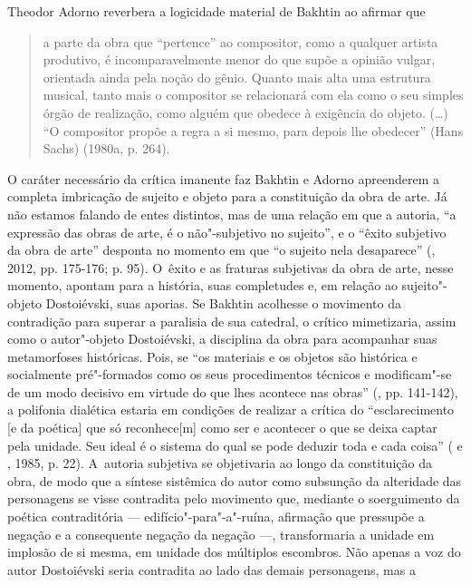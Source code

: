 Theodor Adorno reverbera a logicidade material de Bakhtin ao afirmar que

\begin{quote}
a parte da obra que ``pertence'' ao compositor, como a qualquer artista
produtivo, é incomparavelmente menor do que supõe a opinião vulgar,
orientada ainda pela noção do gênio. Quanto mais alta uma estrutura
musical, tanto mais o compositor se relacionará com ela como o seu
simples órgão de realização, como alguém que obedece à exigência do
objeto. (\ldots) ``O compositor propõe a regra a si mesmo, para depois lhe
obedecer'' (Hans Sachs) (1980a, p. 264).
\end{quote}

O caráter necessário da crítica imanente faz Bakhtin e Adorno
apreenderem a completa imbricação de sujeito e objeto para a
constituição da obra de arte. Já não estamos falando de entes distintos,
mas de uma relação em que a autoria, ``a expressão das obras de arte, é
o não"-subjetivo no sujeito'', e o ``êxito subjetivo da obra de arte''
desponta no momento em que ``o sujeito nela desaparece'' (, 2012,
pp. 175-176; p. 95). O~êxito e as fraturas subjetivas da obra de arte,
nesse momento, apontam para a história, suas completudes e, em relação
ao sujeito"-objeto Dostoiévski, suas aporias. Se Bakhtin acolhesse o
movimento da contradição para superar a paralisia de sua catedral, o
crítico mimetizaria, assim como o autor"-objeto Dostoiévski, a disciplina
da obra para acompanhar suas metamorfoses históricas. Pois, se ``os
materiais e os objetos são histórica e socialmente pré"-formados como os
seus procedimentos técnicos e modificam"-se de um modo decisivo em
virtude do que lhes acontece nas obras'' (, pp. 141-142), a
polifonia dialética estaria em condições de realizar a crítica do
``esclarecimento {[}e da poética{]} que só reconhece{[}m{]} como ser e
acontecer o que se deixa captar pela unidade. Seu ideal é o sistema do
qual se pode deduzir toda e cada coisa'' ( e , 1985, p.
22). A~autoria subjetiva se objetivaria ao longo da constituição da
obra, de modo que a síntese sistêmica do autor como subsunção da
alteridade das personagens se visse contradita pelo movimento que,
mediante o soerguimento da poética contraditória ---
edifício"-para"-a"-ruína, afirmação que pressupõe a negação e a consequente
negação da negação ---, transformaria a unidade em implosão de si mesma,
em unidade dos múltiplos escombros. Não apenas a voz do autor
Dostoiévski seria contradita ao lado das demais personagens, mas a
